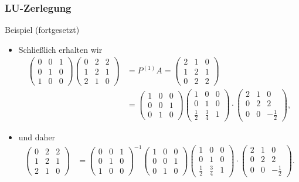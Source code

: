\documentclass{beamer}
\newcommand{\mytitle}{LU-Zerlegung}
\begin{document}
\begin{frame}\frametitle{\mytitle}
	\begin{block}{Beispiel (fortgesetzt)}
		\begin{itemize}
			\item Schlie\ss lich erhalten wir
				\begin{align*}
					\begin{pmatrix} 0&0&1\\ 0&1&0\\ 1&0&0 \end{pmatrix}\begin{pmatrix} 0&2&2\\ 1&2&1\\ 2&1&0 \end{pmatrix}&=P^{(1)}A=\begin{pmatrix} 2&1&0\\ 1&2&1\\ 0&2&2  \end{pmatrix}\\
									 &=\begin{pmatrix} 1&0&0\\ 0&0&1\\0&1&0 \end{pmatrix}\begin{pmatrix}1&0&0\\0&1&0\\\frac{1}{2}&\frac{3}{4}&1\end{pmatrix}\cdot\begin{pmatrix} 2&1&0\\ 0&2&2\\ 0&0&-\frac{1}{2} \end{pmatrix},	
				\end{align*}
			\item und daher
				\begin{align*}
					\begin{pmatrix} 0&2&2\\ 1&2&1\\ 2&1&0 \end{pmatrix}&=\begin{pmatrix} 0&0&1\\ 0&1&0\\ 1&0&0 \end{pmatrix}^{-1}
\begin{pmatrix} 1&0&0\\ 0&0&1\\0&1&0 \end{pmatrix}\begin{pmatrix}1&0&0\\0&1&0\\\frac{1}{2}&\frac{3}{4}&1\end{pmatrix}\cdot\begin{pmatrix} 2&1&0\\ 0&2&2\\ 0&0&-\frac{1}{2} \end{pmatrix}.	
				\end{align*}
		\end{itemize}
	\end{block}
\end{frame}
\end{document}
